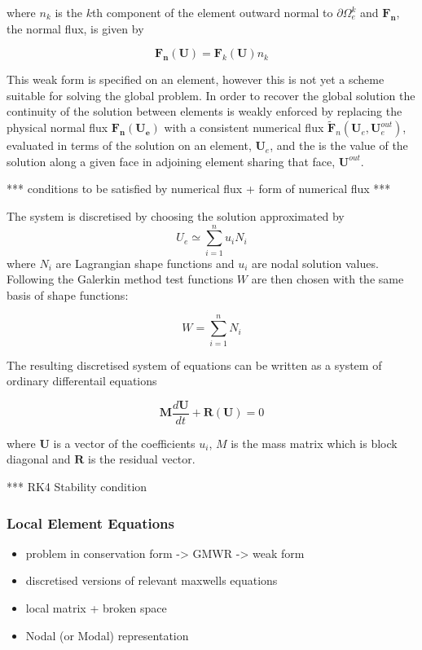 where $n_k$ is the $k$th component of the element outward normal to $\partial \Omega_e^k$ and $\mathbf{F_n}$, the normal flux, is given by

$$
\mathbf{F_n}(\mathbf{U}) = \mathbf{F}_k(\mathbf{U}) n_k
$$

This weak form is specified on an element, however this is not yet a scheme suitable for solving the global problem. In order to recover the global solution the continuity of the solution between elements is weakly enforced by replacing the physical normal flux $\mathbf{F_n}(\mathbf{U_e})$ with a consistent numerical flux $\mathbf{\tilde{F}}_n(\mathbf{U}_e,\mathbf{U}_e^{out})$, evaluated in terms of the solution on an element, $\mathbf{U}_e$, and the is the value of the solution along a given face in adjoining element sharing that face, $\mathbf{U}^{out}$.

*** conditions to be satisfied by numerical flux + form of numerical flux ***

The system is discretised by choosing the solution approximated by
$$
U_e \simeq \sum_{i=1}^{n} u_{i} N_{i}
$$
where $N_{i}$ are Lagrangian shape functions and $u_{i}$ are nodal solution values. Following the Galerkin method test functions $W$ are then chosen with the same basis of shape functions:

$$
W = \sum_{i=1}^{n} N_{i}
$$

The resulting discretised system of equations can be written as a system of ordinary differentail equations

$$
\mathbf{M} \frac{d \mathbf{U}} {dt} + \mathbf{R}(\mathbf{U}) = 0
$$

where $\mathbf{U}$ is a vector of the coefficients $u_{i}$, $M$ is the mass matrix which is block diagonal and $\mathbf{R}$ is the residual vector.

*** RK4 Stability condition

\subsubsection{Local Element Equations}
\begin{itemize}
  \item problem in conservation form -> GMWR -> weak form
  \item discretised versions of relevant maxwells equations
	\item local matrix + broken space
	\item Nodal (or Modal) representation
\end{itemize}
